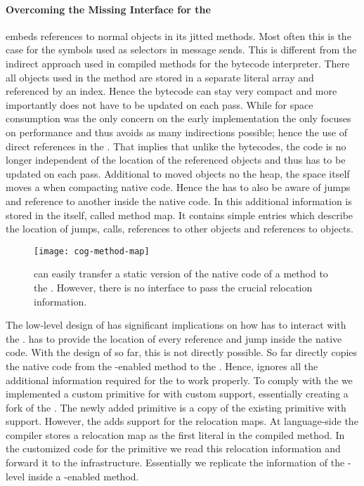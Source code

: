 \paragraph{Overcoming the Missing \VM Interface for the \JIT}
\Cog embeds references to normal \PH objects in its jitted methods.
Most often this is the case for the symbols used as selectors in message sends.
This is different from the indirect approach used in compiled methods for the bytecode interpreter.
There all objects used in the method are stored in a separate literal array and referenced by an index.
Hence the bytecode can stay very compact and more importantly does not have to be updated on each \GC pass.
While for space consumption was the only concern on the early \ST implementation the \JIT only focuses on performance and thus avoids as many indirections possible; hence the use of direct references in the \JIT.
That implies that unlike the bytecodes, the \JIT code is no longer independent of the location of the referenced objects and thus has to be updated on each \GC pass.
Additional to moved objects no the \PH heap, the \JIT space itself moves a \CogMethod when compacting native code.
Hence the \GC has to also be aware of jumps and reference to another \CogMethod inside the native code.
In \Cog this additional information is stored in the \CogMethod itself, called method map.
It contains simple entries which describe the location of jumps, calls, references to other \CogMethod objects and references to \PH objects.
%
\begin{figure}[h]
	\centering
	\texttt{[image: cog-method-map]}
	\caption[\Nabujito-generated Relocation Maps]{
	\NBJ can easily transfer a static version of the native code of a \PH method to the \JIT.
	However, there is no interface to pass the crucial relocation information.
	}
\end{figure}

The low-level design of \Cog has significant implications on how \NBJ has to interact with the \VM.
\NBJ has to provide the location of every reference and jump inside the native code.
With the design of \NBJ so far, this is not directly possible.
So far \NBJ directly copies the native code from the \B-enabled method to the \CogMethod.
Hence, \NBJ ignores all the additional information required for the \JIT to work properly.
To comply with the \JIT we implemented a custom primitive for \NBJ with custom \JIT support, essentially creating a fork of the \VM.
The newly added primitive is a copy of the existing \B primitive with \JIT support.
However, the \NBJ adds support for the \CogMethod relocation maps.
At language-side the \NBJ compiler stores a relocation map as the first literal in the compiled method. 
In the customized \JIT code for the \NBJ primitive we read this relocation information and forward it to the \Cog \JIT infrastructure.
Essentially we replicate the information of the \JIT-level \CogMethod inside a \B-enabled \PH method.

